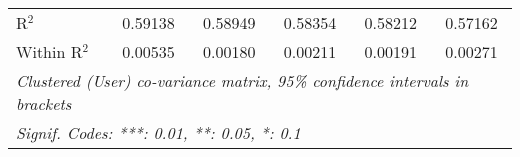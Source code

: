 \begin{table}[htbp]
\begin{threeparttable}[b]
\begin{tabular}{lccccc}
         R$^2$              & 0.59138         & 0.58949         & 0.58354        & 0.58212        & 0.57162\\  
         Within R$^2$       & 0.00535         & 0.00180         & 0.00211        & 0.00191        & 0.00271\\  
         \midrule \midrule
         \multicolumn{6}{l}{\emph{Clustered (User) co-variance matrix, 95\% confidence intervals in brackets}}\\
         \multicolumn{6}{l}{\emph{Signif. Codes: ***: 0.01, **: 0.05, *: 0.1}}\\
      \end{tabular}
   \end{threeparttable}
\end{table}


